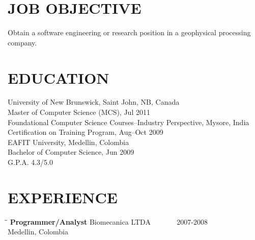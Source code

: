 \documentclass{res}
\begin{document}
 


                                  
\begin{resume}

\section{JOB OBJECTIVE}          
   \vspace{0.05 in}
 Obtain a software engineering or research position in a geophysical processing company.
\section{EDUCATION}
   \vspace{0.05 in}
	University of New Brunswick, Saint John, NB, Canada\\
	Master of Computer Science (MCS), Jul 2011\\\vspace{10pt}
	Foundational Computer Science Courses--Industry Perspective, Mysore, India\\
	Certification on Training Program, Aug--Oct 2009\\\vspace{10pt}       
    EAFIT University, Medellin, Colombia\\        
    Bachelor of Computer Science, Jun 2009\\       
    G.P.A. 4.3/5.0          
 
\section{EXPERIENCE}
   \vspace{0.05 in}	
   \begin{tabbing}
   \hspace{2.3in}\= \hspace{2.6in}\= \kill %
    {\bf Programmer/Analyst} \>Biomecanica LTDA\> ~~~~~~ 2007-2008\\
                             \>Medellin, Colombia
   \end{tabbing}\vspace{-15pt}      %


\end{resume}
\end{document}
